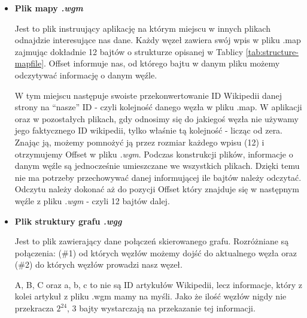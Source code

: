 \begin{itemize}
    \item
\textbf{Plik mapy \textit{.wgm}}\newline

Jest to plik instruujący aplikację na którym miejscu w innych plikach odnajdzie interesujące nas dane.
Każdy węzeł zawiera swój wpis w pliku .map zajmując dokładnie 12 bajtów o strukturze opisanej w Tablicy \ref{tab:structure-mapfile}. Offset informuje nas, od którego bajtu w danym pliku możemy odczytywać informację o danym węźle.


W tym miejscu następuje swoiste przekonwertowanie ID Wikipedii danej strony na “nasze” ID - czyli kolejność danego węzła w pliku .map. W aplikacji oraz w pozostałych plikach, gdy odnosimy się do jakiegoś węzła nie używamy jego faktycznego ID wikipedii, tylko właśnie tą kolejność - licząc od zera. Znając ją, możemy pomnożyć ją przez rozmiar każdego wpisu (12) i otrzymujemy Offset w pliku \textit{.wgm}. Podczas konstrukcji plików, informacje o danym węźle są jednocześnie umieszczane we wszystkich plikach. Dzięki temu nie ma potrzeby przechowywać danej informującej ile bajtów należy odczytać. Odczytu należy dokonać aż do pozycji Offset który znajduje się w następnym węźle z pliku \textit{.wgm} - czyli 12 bajtów dalej.

\item
\textbf{Plik struktury grafu \textit{.wgg}}

Jest to plik zawierający dane połączeń skierowanego grafu. Rozróżniane są połączenia: (\#1) od których węzłów możemy dojść do aktualnego węzła oraz (\#2) do których węzłów prowadzi nasz węzeł.


A, B, C oraz a, b, c to nie są ID artykułów Wikipedii, lecz informacje, który z kolei artykuł z pliku .wgm mamy na myśli. Jako że ilość węzłów nigdy nie przekracza $2^{24}$, 3 bajty wystarczają na przekazanie tej informacji.


\end{itemize}
